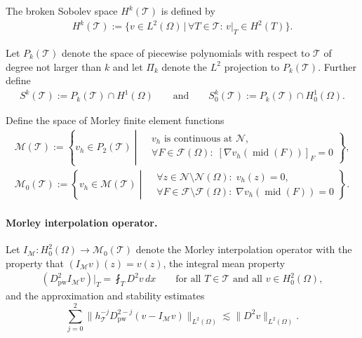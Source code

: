 \documentclass[a4paper]{amsart}
\theoremstyle{definition}
\numberwithin{equation}{section}
\numberwithin{theorem}{section}
\newcommand{\pw}{\mathrm{pw}}
\newcommand{\tri}{\mathcal{T}}
\begin{document}
The broken Sobolev space $H^k(\tri)$ is defined by 
\begin{align*}
    H^k(\tri):=\{v\in L^2(\Omega)\,\vert\,
      \forall T\in\tri:\, v\vert_T\in H^2(T)\}.
\end{align*}


Let $P_k(\tri)$ denote the space
of piecewise polynomials with respect to $\tri$
of degree not larger than $k$
and let $\Pi_k$ denote the $L^2$ projection to $P_k(\tri)$.
Further define
\begin{align*}
	S^k(\tri):=P_k(\tri)\cap H^1(\Omega)
	\qquad \text{and} \qquad
	S^k_0(\tri):=P_k(\tri)\cap H^1_0(\Omega).
\end{align*}


Define the space of Morley finite element functions 
\begin{align*}
    \mathcal{M}(\tri)
    :=\left\{v_h\in P_2(\tri)\;\left\vert\;
        \begin{aligned}
            &v_h\text{ is continuous at }\mathcal{N},\\
            &\forall F\in\mathcal{F}(\Omega):\;
            [\nabla v_h(\operatorname{mid}(F))]_F=0
        \end{aligned}
        \right\}\right.,\\
    \mathcal{M}_0(\tri)
    :=\left\{v_h\in \mathcal{M}(\tri)\;\left\vert\;
        \begin{aligned}
            &\forall z\in\mathcal{N}\setminus\mathcal{N}(\Omega):\; v_h(z)=0,\\
            &\forall F\in\mathcal{F}\setminus \mathcal{F}(\Omega):\;
            \nabla v_h(\operatorname{mid}(F))=0
        \end{aligned}
        \right\}\right. .
\end{align*}



\paragraph{Morley interpolation operator.}
Let $I_\mathcal{M}:H^2_0(\Omega)\to\mathcal{M}_0(\tri)$ denote the 
Morley interpolation operator with the property that 
$(I_\mathcal{M}v)(z)=v(z)$,  
the integral mean property
\begin{align}\label{e:integral_mean_property}
    (D^2_\pw I_\mathcal{M} v)\vert_T 
    = \fint_T D^2 v\,dx 
    \qquad \text{for all }T\in\tri \text{ and all } v\in H^2_0(\Omega),
\end{align}
and the approximation and stability estimates 
\cite{HuShiXu2012}
\begin{equation}\label{e:estimate_Morley_interpolation1}
    \sum_{j=0}^2\lVert h_\tri^{-j}D_\pw^{2-j}(v-I_\mathcal{M}v)\rVert_{L^2(\Omega)}
        \lesssim \lVert D^2 v\rVert_{L^2(\Omega)}.
\end{equation}
\end{document}
